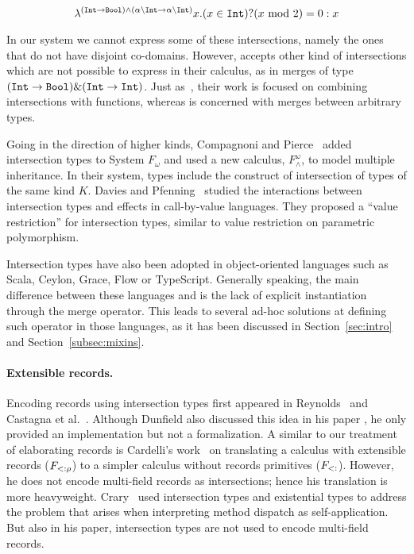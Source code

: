 \[
\lambda^{(\texttt{Int} \to \texttt{Bool}) \wedge (\alpha \backslash \texttt{Int} \to \alpha \backslash \texttt{Int})} 
x. (x \in \texttt{Int}) ? (x \text{ mod } 2) = 0 : x
\]

\noindent In our system we cannot express some of these intersections, namely the ones that
do not have disjoint co-domains.
However, \name accepts other kind of intersections which are not possible to express
in their calculus, as in merges of type $(\texttt{Int} \to \texttt{Bool}) \& (\texttt{Int} \to \texttt{Int})$.
Just as~\cite{Castagna92calculus}, their work is focused on combining 
intersections with functions, whereas \name is concerned with merges between
arbitrary types.

Going in the direction of higher
kinds, Compagnoni and Pierce~\cite{compagnoni1996higher} added
intersection types to System $ F_{\omega} $ and used a new calculus,
$ F^{\omega}_{\wedge} $, to model multiple inheritance. 
In their system, types include the construct of intersection of types of the
same kind $ K $. 
Davies and Pfenning~\cite{davies2000intersection} studied the interactions between
intersection types and effects in call-by-value languages. 
They proposed a ``value restriction'' for intersection types, similar to
value restriction on parametric polymorphism.

Intersection types have also been adopted in object-oriented languages such as Scala,
Ceylon, Grace, Flow or TypeScript.
Generally speaking, the main difference between these languages and \name is the lack
of explicit instantiation through the merge operator.
This leads to several ad-hoc solutions at defining such operator in those languages,
as it has been discussed in Section~\ref{sec:intro} and Section~\ref{subsec:mixins}. 

\paragraph{Extensible records.}%
Encoding records using intersection types first appeared in 
Reynolds~\cite{reynolds1997design} and Castagna et al.~\cite{castagna1995calculus}. 
Although Dunfield also discussed this idea in his paper \cite{dunfield2014elaborating}, 
he only provided an implementation but not a formalization. 
A similar to our treatment of elaborating records is
Cardelli's work~\cite{cardelli1992extensible} on translating a calculus
with extensible records ($ F_{<: \rho}$) to a simpler calculus without
records primitives ($ F_{<:} $). 
However, he does not encode multi-field records as intersections; hence his translation is more
heavyweight. 
Crary~\cite{crary1998simple} used intersection types and
existential types to address the problem that arises when interpreting method
dispatch as self-application. 
But also in his paper, intersection types are not used to encode multi-field records.

